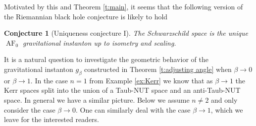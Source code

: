 \documentclass[a4paper,11pt]{amsart}
\newtheorem{conjecture}[theorem]{Conjecture}
\theoremstyle{definition}
\numberwithin{equation}{section}
\DeclareMathOperator{\AF}{AF}
\DeclareMathOperator{\AFa}{AF_\beta}
\begin{document}
Motivated by this and Theorem \ref{t:main}, it seems that the following version of the Riemannian black hole conjecture is likely to hold

\begin{conjecture}[Uniqueness conjecture I]
         The Schwarzschild space is the unique $\AF_0$ gravitational instanton up to isometry and scaling. 
\end{conjecture}
    It is a natural question to investigate the geometric behavior of the $\AFa$ gravitational instanton $g_\beta$ constructed in Theorem \ref{t:adjusting angle} when $\beta\rightarrow 0$ or $\beta\rightarrow 1$. In the case $n=1$ from Example \ref{ex:Kerr} we know that as $\beta\rightarrow1$ the Kerr spaces split into the union of a  Taub-NUT space and an anti-Taub-NUT space. In general we have a similar picture. Below we assume $n\neq 2$ and only consider the case $\beta\rightarrow 0$. One can similarly deal with the case $\beta\rightarrow 1$, which we leave for the interested readers. 
    
\end{document}
